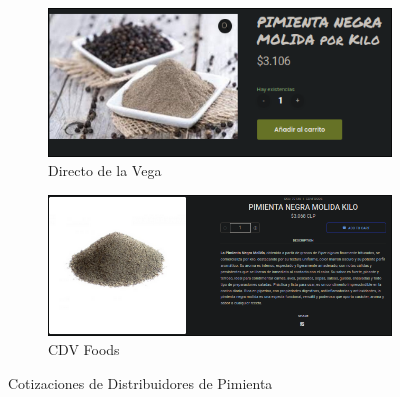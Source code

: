 \documentclass[12pt]{article}
\begin{document}
        \begin{figure}[H] %
            \centering
            \begin{subfigure}{0.45\textwidth}
                \centering
                \includegraphics[width=0.9\linewidth]{negra} %
                \caption{Directo de la Vega}
                \label{fig:directo_de_la_vega_pimienta}
            \end{subfigure}
            \hfill
            \begin{subfigure}{0.5\textwidth}
                \centering
                \includegraphics[width=0.9\linewidth]{pimienta} %
                \caption{CDV Foods}
                \label{fig:cdv_foods_pimienta}
            \end{subfigure}
            \caption{Cotizaciones de Distribuidores de Pimienta}
            \label{fig:cotizaciones_pimienta}
        \end{figure} %
\end{document}

